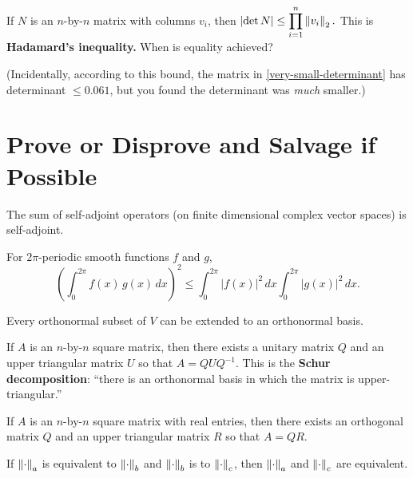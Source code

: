 \documentclass{homework}
\begin{document}
\begin{problem}
If $N$ is an $n$-by-$n$ matrix with columns $v_i$, then
\( \displaystyle\left| \det  N  \right| \leq \prod_{i=1}^n \left\lVert v_i\right\rVert_2. \)
This is \textbf{Hadamard's inequality.}  When is equality achieved?

(Incidentally, according to this bound, the matrix in \ref{very-small-determinant} has determinant $\leq 0.061$, but you found the determinant was \textit{much} smaller.)
\end{problem}

\section{Prove or Disprove and Salvage if Possible}

\begin{problem}
  The sum of self-adjoint operators (on finite dimensional complex vector spaces) is self-adjoint.
\end{problem}

\begin{problem}\label{cauchy-schwarz-application}For $2\pi$-periodic smooth functions $f$ and $g$,
  \[
    \left( \int_{0}^{2\pi} f(x) \, g(x) \, dx  \right)^2 \leq
    \int_{0}^{2\pi} \left| f(x) \right|^2 \, dx
    \int_{0}^{2\pi} \left| g(x) \right|^2 \, dx.
  \]
\end{problem}

\begin{problem}
  Every orthonormal subset of $V$ can be extended to an orthonormal basis.
\end{problem}

\begin{problem}\label{schur-decomposition}If $A$ is an $n$-by-$n$ square matrix, then there exists a unitary matrix $Q$ and an upper triangular matrix $U$ so that $A = QUQ^{-1}$.  This is the \textbf{Schur decomposition}: ``there is an orthonormal basis in which the matrix is upper-triangular.''
\end{problem}%

\begin{problem}\label{qr-decomposition}If $A$ is an $n$-by-$n$ square matrix with real entries, then there exists an orthogonal matrix $Q$ and an upper triangular matrix $R$ so that $A = QR$.
\end{problem}

\begin{problem}\label{transitivity-of-equivalence-of-norms}If $\left\lVert\cdot\right\rVert_a$ is equivalent to $\left\lVert\cdot\right\rVert_b$ and $\left\lVert\cdot\right\rVert_b$ is to $\left\lVert\cdot\right\rVert_c$, then $\left\lVert\cdot\right\rVert_a$ and $\left\lVert\cdot\right\rVert_c$ are equivalent. %
\end{problem}
\end{document}
